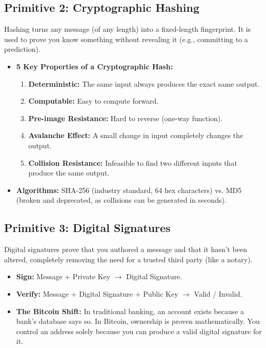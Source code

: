 \subsection{Primitive 2: Cryptographic Hashing}
Hashing turns any message (of any length) into a fixed-length fingerprint. It
is used to prove you know something without revealing it (e.g., committing to a
prediction).
\begin{itemize}
    \item \textbf{5 Key Properties of a Cryptographic Hash:}
          \begin{enumerate}
              \item \textbf{Deterministic:} The same input always produces the exact same output.
              \item \textbf{Computable:} Easy to compute forward.
              \item \textbf{Pre-image Resistance:} Hard to reverse (one-way function).
              \item \textbf{Avalanche Effect:} A small change in input completely changes the output.
              \item \textbf{Collision Resistance:} Infeasible to find two different inputs that produce the
                    same output.
          \end{enumerate}
    \item \textbf{Algorithms:} SHA-256 (industry standard, 64 hex characters) vs. MD5 (broken and
          deprecated, as collisions can be generated in seconds).
\end{itemize}

\subsection{Primitive 3: Digital Signatures}
Digital signatures prove that you authored a message and that it hasn't been
altered, completely removing the need for a trusted third party (like a
notary).
\begin{itemize}
    \item \textbf{Sign:} Message + Private Key $\rightarrow$ Digital Signature.
    \item \textbf{Verify:} Message + Digital Signature + Public Key $\rightarrow$ Valid /
          Invalid.
    \item \textbf{The Bitcoin Shift:} In traditional banking, an account exists because a bank's
          database says so. In Bitcoin, ownership is proven mathematically. You control
          an address solely because you can produce a valid digital signature for it.
\end{itemize}


